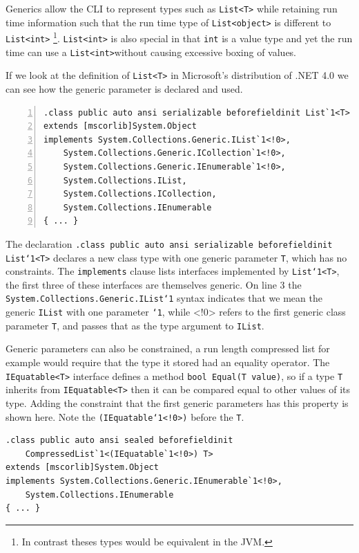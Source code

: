 \documentclass[english]{report}
\begin{document}
Generics allow the CLI to represent types such as \texttt{List<T>}
while retaining run time information such that the run time type of
\texttt{List<object>} is different to \texttt{List<int>}%
\footnote{In contrast theses types would be equivalent in the JVM.%
}. \texttt{List<int>} is also special in that \texttt{int} is a value
type and yet the run time can use a \texttt{List<int>}without causing
excessive boxing of values.

If we look at the definition of \texttt{List<T>} in Microsoft\textquoteright{}s
distribution of .NET 4.0 we can see how the generic parameter is declared
and used.
\begin{lstlisting}[numbers=left]
.class public auto ansi serializable beforefieldinit List`1<T>
extends [mscorlib]System.Object 
implements System.Collections.Generic.IList`1<!0>, 
	System.Collections.Generic.ICollection`1<!0>, 
	System.Collections.Generic.IEnumerable`1<!0>, 
	System.Collections.IList, 
	System.Collections.ICollection, 
	System.Collections.IEnumerable
{ ... }
\end{lstlisting}


The declaration \texttt{.class public auto ansi serializable beforefieldinit
List`1<T>} declares a new class type with one generic parameter \texttt{T},
which has no constraints. The \texttt{implements} clause lists interfaces
implemented by \texttt{List`1<T>}, the first three of these interfaces
are themselves generic. On line 3 the \texttt{System.Collections.Generic.IList`1}
syntax indicates that we mean the generic \texttt{IList} with one
parameter \texttt{`1}, while <!0> refers to the first generic class
parameter \texttt{T}, and passes that as the type argument to \texttt{IList}.

Generic parameters can also be constrained, a run length compressed
list for example would require that the type it stored had an equality
operator. The \texttt{IEquatable<T>} interface defines a method \texttt{bool
Equal(T value)}, so if a type \texttt{T} inherits from \texttt{IEquatable<T>}
then it can be compared equal to other values of its type. Adding
the constraint that the first generic parameters has this property
is shown here. Note the \texttt{(IEquatable`1<!0>)} before the \texttt{T}.

\begin{lstlisting}[]
.class public auto ansi sealed beforefieldinit
	CompressedList`1<(IEquatable`1<!0>) T> 
extends [mscorlib]System.Object
implements System.Collections.Generic.IEnumerable`1<!0>, 
	System.Collections.IEnumerable
{ ... }
\end{lstlisting}
\end{document}
